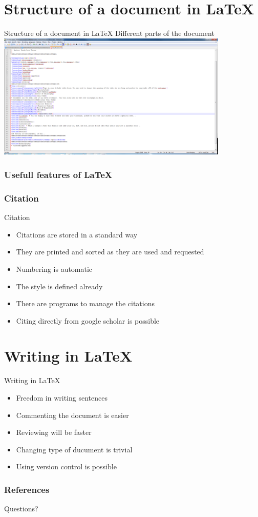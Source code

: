 \documentclass{beamer}
\begin{document}
\section{Structure of a document in \LaTeX}

\begin{frame}{Structure of a document in \LaTeX}
Different parts of the document
\includegraphics[height=6cm,trim = 0mm 20mm 0mm 0mm]{../figs/sample_thesis_document.png}
\end{frame}

\subsubsection{Usefull features of \LaTeX}
\subsubsection{Citation} 

\begin{frame}{Citation}

\begin{itemize}
  \item Citations are stored in a standard way
  \item They are printed and sorted as they are used and requested
  \item Numbering is automatic
  \item The style is defined already
  \item There are programs to manage the citations
  \item Citing directly from google scholar is possible 
\end{itemize}
\end{frame} 


\section{Writing in \LaTeX}
\begin{frame}{Writing in \LaTeX}  
\begin{itemize}
  \item Freedom in writing sentences
  \item Commenting the document is easier
  \item Reviewing will be faster
  \item Changing type of ducument is trivial
  \item Using version control is possible
\end{itemize}
\end{frame}

\begin{frame}[allowframebreaks]
\tiny
        \frametitle{References}
        
        
\end{frame}

\begin{frame}
\centering
Questions?
\end{frame}
\end{document}
